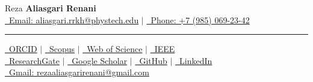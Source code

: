 \noindent
\begin{minipage}[t]{\cvheaderleftcolumnwidth}
    \vspace{\cvheadervoffset}
    {\cvnamefont Reza {\bfseries Aliasgari Renani}} \\[\cvnameafterspace]
    {\cvcontactfont
    \href{mailto:aliasgari.rrkh@phystech.edu}{\raisebox{0\height}\faEnvelope\ Email: aliasgari.rrkh@phystech.edu} \quad $|$ \quad
    \href{tel:+79850692342}{\raisebox{0\height}\faPhone\ Phone: +7 (985) 069-23-42}}
\end{minipage}
\hfill
\begin{minipage}[t]{\cvheaderdividercolumnwidth}
    \vspace{\cvheadervoffset}
    \centering
    \color{black!45}\rule{\cvdividerwidth}{\cvdividerheight}
\end{minipage}
\hfill
\begin{minipage}[t]{\cvheaderrightcolumnwidth}
    \vspace{\cvheadervoffset}
    {\cvlinksfont
    \href{https://orcid.org/0009-0000-8983-755X}{\raisebox{0\height}\aiOrcid\ ORCID} $|$
    \href{https://www.scopus.com/authid/detail.uri?authorId=58953218100}{\raisebox{0\height}\aiScopus\ Scopus} $|$
    \href{https://www.webofscience.com/wos/author/record/OBN-8060-2025}{\ Web of Science} $|$
    \href{https://ieeexplore.ieee.org/author/808687147056276}{\raisebox{-0.1\height}{\aiIEEE}\ IEEE} \\
    \href{https://www.researchgate.net/profile/Reza-Aliasgari-Renani}{\raisebox{0\height}\faResearchgate\ ResearchGate} $|$
    \href{https://scholar.google.com/citations?user=L9Vv3C8AAAAJ&hl=en}{\ Google Scholar} $|$
    \href{https://github.com/rezaaliasgarirenani}{\raisebox{0\height}\faGithub\ GitHub} $|$
    \href{https://linkedin.com/in/reza-aliasgari-renani}{\raisebox{0\height}\faLinkedin\ LinkedIn} \\
    \href{mailto:rezaaliasgarirenani@gmail.com}{\ Gmail: rezaaliasgarirenani@gmail.com}}
\end{minipage}


